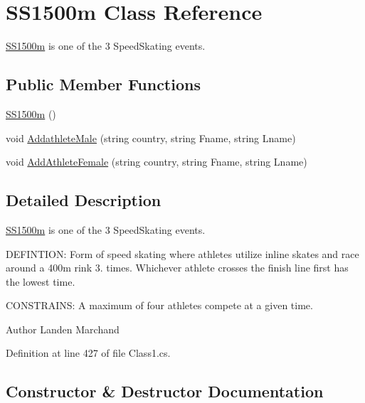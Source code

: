 \hypertarget{classSS1500m}{}\section{S\+S1500m Class Reference}
\label{classSS1500m}


\hyperlink{classSS1500m}{S\+S1500m} is one of the 3 Speed\+Skating events.  


\subsection*{Public Member Functions}
\begin{DoxyCompactItemize}
\item 
\hyperlink{classSS1500m_ad2c8b9954c13aa78db226ad188541061}{S\+S1500m} ()
\item 
void \hyperlink{classSS1500m_abfbd5eb057e580ba3fdd97671acbbef3}{Addathlete\+Male} (string country, string Fname, string Lname)
\item 
void \hyperlink{classSS1500m_afe813f2eaa702eb925477e2ff9f13929}{Add\+Athlete\+Female} (string country, string Fname, string Lname)
\end{DoxyCompactItemize}


\subsection{Detailed Description}
\hyperlink{classSS1500m}{S\+S1500m} is one of the 3 Speed\+Skating events. 

D\+E\+F\+I\+N\+T\+I\+ON\+: Form of speed skating where athletes utilize inline skates and race around a 400m rink 3. times. Whichever athlete crosses the finish line first has the lowest time.

C\+O\+N\+S\+T\+R\+A\+I\+NS\+: A maximum of four athletes compete at a given time.\begin{DoxyAuthor}{Author}
Landen Marchand 
\end{DoxyAuthor}


Definition at line 427 of file Class1.\+cs.



\subsection{Constructor \& Destructor Documentation}
\mbox{\label{classSS1500m_ad2c8b9954c13aa78db226ad188541061}} 
